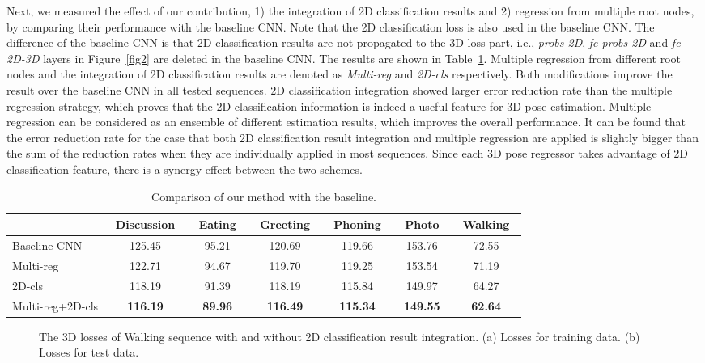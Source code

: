 \documentclass[runningheads]{llncs}
\begin{document}
Next, we measured the effect of our contribution, 1) the integration of 2D classification results and 2) regression from multiple root nodes, by comparing their performance with the baseline CNN. Note that the 2D classification loss is also used in the baseline CNN. The difference of the baseline CNN is that 2D classification results are not propagated to the 3D loss part, i.e., \textit{probs 2D}, \textit{fc probs 2D} and \textit{fc 2D-3D} layers in Figure~\ref{fig2} are deleted in the baseline CNN. The results are shown in Table~\ref{tab2}. Multiple regression from different root nodes and the integration of 2D classification results are denoted as \textit{Multi-reg} and \textit{2D-cls} respectively. Both modifications improve the result over the baseline CNN in all tested sequences. 2D classification integration showed larger error reduction rate than the multiple regression strategy, which proves that the 2D classification information is indeed a useful feature for 3D pose estimation. Multiple regression can be considered as an ensemble of different estimation results, which improves the overall performance. It can be found that the error reduction rate for the case that both 2D classification result integration and multiple regression are applied is slightly bigger than the sum of the reduction rates when they are individually applied in most sequences. Since each 3D pose regressor takes advantage of 2D classification feature, there is a synergy effect between the two schemes.

\begin{table}[t]
\centering
\caption{Comparison of our method with the baseline.}
\label{tab2}
\begin{tabular}{ l c c c c c c }
  \hline
  \quad & \, Discussion \,  &  \, Eating \,  &  \, Greeting \,  &  \, Phoning \,  &  \, Photo \,  &  \, Walking \,  \\ \hline
  Baseline CNN & 125.45 & 95.21 & 120.69 & 119.66 & 153.76 & 72.55 \\
  Multi-reg & 122.71 & 94.67 & 119.70 & 119.25 & 153.54 & 71.19 \\
  2D-cls & 118.19 & 91.39 & 118.19 & 115.84 & 149.97 & 64.27 \\
  Multi-reg+2D-cls & \bf 116.19 & \bf 89.96 & \bf 116.49 & \bf 115.34 & \bf 149.55 & \bf 62.64 \\ \hline
\end{tabular}
\end{table}

\begin{figure}[t]
\centering
  \caption{The 3D losses of Walking sequence with and without 2D classification result integration. (a) Losses for training data. (b) Losses for test data.}
  \label{fig4}
\end{figure}
\end{document}
